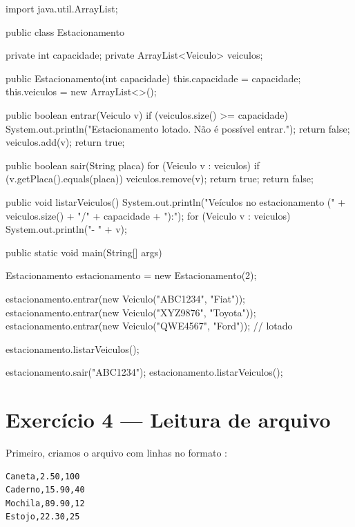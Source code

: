 \documentclass[11pt,a4paper]{article}
\begin{document}
\begin{javacode}
import java.util.ArrayList;

public class Estacionamento {
    private int capacidade;
    private ArrayList<Veiculo> veiculos;

    public Estacionamento(int capacidade) {
        this.capacidade = capacidade;
        this.veiculos = new ArrayList<>();
    }

    public boolean entrar(Veiculo v) {
        if (veiculos.size() >= capacidade) {
            System.out.println("Estacionamento lotado. Não é possível entrar.");
            return false;
        }
        veiculos.add(v);
        return true;
    }

    public boolean sair(String placa) {
        for (Veiculo v : veiculos) {
            if (v.getPlaca().equals(placa)) {
                veiculos.remove(v);
                return true;
            }
        }
        return false;
    }

    public void listarVeiculos() {
        System.out.println("Veículos no estacionamento (" + veiculos.size() + "/" + capacidade + "):");
        for (Veiculo v : veiculos) {
            System.out.println("- " + v);
        }
    }

    public static void main(String[] args) {
        Estacionamento estacionamento = new Estacionamento(2);

        estacionamento.entrar(new Veiculo("ABC1234", "Fiat"));
        estacionamento.entrar(new Veiculo("XYZ9876", "Toyota"));
        estacionamento.entrar(new Veiculo("QWE4567", "Ford")); // lotado

        estacionamento.listarVeiculos();

        estacionamento.sair("ABC1234");
        estacionamento.listarVeiculos();
    }
}
\end{javacode}

\section{Exercício 4 --- Leitura de arquivo}

Primeiro, criamos o arquivo  com linhas no formato :

\begin{verbatim}
Caneta,2.50,100
Caderno,15.90,40
Mochila,89.90,12
Estojo,22.30,25
\end{verbatim}
\end{document}
